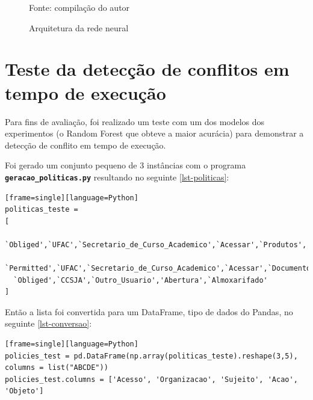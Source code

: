 \begin{figure}[H]
	\centering
	\caption{Arquitetura da rede neural}
	
	\label{fig:arquitetura-rede-pytorch}
	{\scriptsize Fonte: compilação do autor}
\end{figure}

\section{Teste da detecção de conflitos em tempo de execução}\label{teste}
Para fins de avaliação, foi realizado um teste com um dos modelos dos experimentos (o Random Forest que obteve a maior acurácia) para demonstrar a detecção de conflito em tempo de execução.

Foi gerado um conjunto pequeno de 3 instâncias com o programa \texttt{\textbf{geracao\_politicas.py}} resultando no seguinte \autoref{lst-politicas}:

\begin{lstlisting}[caption={Instâncias geradas aleatoriamente},label=lst-politicas][frame=single][language=Python]
politicas_teste = 
[
  `Obliged',`UFAC',`Secretario_de_Curso_Academico',`Acessar',`Produtos',
  `Permitted',`UFAC',`Secretario_de_Curso_Academico',`Acessar',`Documentos',
  `Obliged',`CCSJA',`Outro_Usuario','Abertura',`Almoxarifado'
]
\end{lstlisting}

Então a lista foi convertida para um DataFrame, tipo de dados do Pandas, no seguinte \autoref{lst-conversao}:
\begin{lstlisting}[caption={Conversão para DataFrame},label=lst-conversao][frame=single][language=Python]
policies_test = pd.DataFrame(np.array(politicas_teste).reshape(3,5), columns = list("ABCDE"))
policies_test.columns = ['Acesso', 'Organizacao', 'Sujeito', 'Acao', 'Objeto']
\end{lstlisting}

